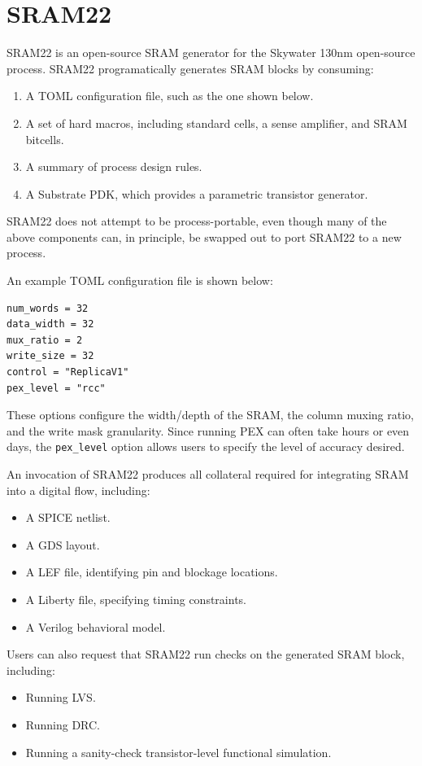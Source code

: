 \chapter{SRAM22} \label{sec:sram22}

SRAM22 is an open-source SRAM generator for the Skywater 130nm open-source process.
SRAM22 programatically generates SRAM blocks by consuming:
\begin{enumerate}
\item A TOML configuration file, such as the one shown below.
\item A set of hard macros, including standard cells, a sense amplifier, and SRAM bitcells.
\item A summary of process design rules.
\item A Substrate PDK, which provides a parametric transistor generator.
\end{enumerate}

SRAM22 does not attempt to be process-portable, even though many of the above components
can, in principle, be swapped out to port SRAM22 to a new process.

An example TOML configuration file is shown below:

\begin{verbatim}
num_words = 32
data_width = 32
mux_ratio = 2
write_size = 32
control = "ReplicaV1"
pex_level = "rcc"
\end{verbatim}

These options configure the width/depth of the SRAM, the column muxing ratio, and the write mask granularity.
Since running PEX can often take hours or even days, the \verb|pex_level| option allows users to specify
the level of accuracy desired.

An invocation of SRAM22 produces all collateral required for integrating SRAM into a digital flow, including:
\begin{itemize}
\item A SPICE netlist.
\item A GDS layout.
\item A LEF file, identifying pin and blockage locations.
\item A Liberty file, specifying timing constraints.
\item A Verilog behavioral model.
\end{itemize}

Users can also request that SRAM22 run checks on the generated SRAM block, including:
\begin{itemize}
\item Running LVS.
\item Running DRC.
\item Running a sanity-check transistor-level functional simulation.
\end{itemize}

